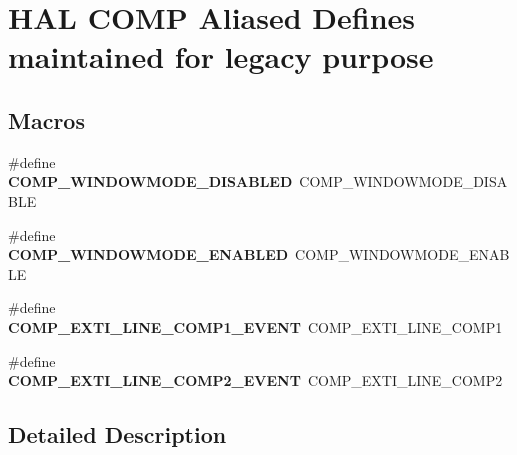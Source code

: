 \hypertarget{group___h_a_l___c_o_m_p___aliased___defines}{}\section{H\+AL C\+O\+MP Aliased Defines maintained for legacy purpose}
\label{group___h_a_l___c_o_m_p___aliased___defines}
\subsection*{Macros}
\begin{DoxyCompactItemize}
\item 
\#define {\bfseries C\+O\+M\+P\+\_\+\+W\+I\+N\+D\+O\+W\+M\+O\+D\+E\+\_\+\+D\+I\+S\+A\+B\+L\+ED}~C\+O\+M\+P\+\_\+\+W\+I\+N\+D\+O\+W\+M\+O\+D\+E\+\_\+\+D\+I\+S\+A\+B\+LE\hypertarget{group___h_a_l___c_o_m_p___aliased___defines_gab9e0400639ad2179b63e519e08741c05}{}\label{group___h_a_l___c_o_m_p___aliased___defines_gab9e0400639ad2179b63e519e08741c05}

\item 
\#define {\bfseries C\+O\+M\+P\+\_\+\+W\+I\+N\+D\+O\+W\+M\+O\+D\+E\+\_\+\+E\+N\+A\+B\+L\+ED}~C\+O\+M\+P\+\_\+\+W\+I\+N\+D\+O\+W\+M\+O\+D\+E\+\_\+\+E\+N\+A\+B\+LE\hypertarget{group___h_a_l___c_o_m_p___aliased___defines_gab481c80a4a4235ca54d2dd39db70926c}{}\label{group___h_a_l___c_o_m_p___aliased___defines_gab481c80a4a4235ca54d2dd39db70926c}

\item 
\#define {\bfseries C\+O\+M\+P\+\_\+\+E\+X\+T\+I\+\_\+\+L\+I\+N\+E\+\_\+\+C\+O\+M\+P1\+\_\+\+E\+V\+E\+NT}~C\+O\+M\+P\+\_\+\+E\+X\+T\+I\+\_\+\+L\+I\+N\+E\+\_\+\+C\+O\+M\+P1\hypertarget{group___h_a_l___c_o_m_p___aliased___defines_gaa53df1592afaa8d2a7d2f417273a50a7}{}\label{group___h_a_l___c_o_m_p___aliased___defines_gaa53df1592afaa8d2a7d2f417273a50a7}

\item 
\#define {\bfseries C\+O\+M\+P\+\_\+\+E\+X\+T\+I\+\_\+\+L\+I\+N\+E\+\_\+\+C\+O\+M\+P2\+\_\+\+E\+V\+E\+NT}~C\+O\+M\+P\+\_\+\+E\+X\+T\+I\+\_\+\+L\+I\+N\+E\+\_\+\+C\+O\+M\+P2\hypertarget{group___h_a_l___c_o_m_p___aliased___defines_gae128dfe3b90b2c0e51cde7de5987f9ef}{}\label{group___h_a_l___c_o_m_p___aliased___defines_gae128dfe3b90b2c0e51cde7de5987f9ef}

\end{DoxyCompactItemize}


\subsection{Detailed Description}
